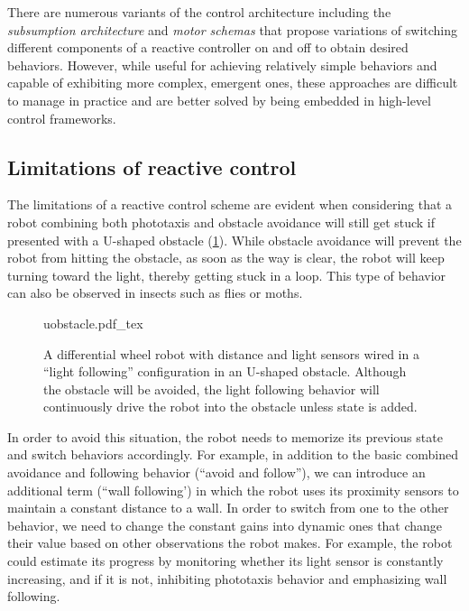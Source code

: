 There are numerous variants of the control architecture including the \textsl{subsumption architecture} \cite{brooks1990elephants} and \textsl{motor schemas} \cite{arkin1989motor} that propose variations of switching different components of a reactive controller on and off to obtain desired behaviors.
However, while useful for achieving relatively simple behaviors and capable of exhibiting more complex, emergent ones, these approaches are difficult to manage in practice and are better solved by being embedded in high-level control frameworks.

\subsection{Limitations of reactive control}

The limitations of a reactive control scheme are evident when considering that a robot combining both phototaxis and obstacle avoidance will still get stuck if presented with a U-shaped obstacle (\cref{fig:uobstacle}). While obstacle avoidance will prevent the robot from hitting the obstacle, as soon as the way is clear, the robot will keep turning toward the light, thereby getting stuck in a loop. This type of behavior can also be observed in insects such as flies or moths.

\begin{figure}
\centering
    \def\svgwidth{0.64\textwidth}
    {uobstacle.pdf_tex}
    \caption{\label{fig:uobstacle}A differential wheel robot with distance and light sensors wired in a ``light following'' configuration in an U-shaped obstacle. Although the obstacle will be avoided, the light following behavior will continuously drive the robot into the obstacle unless state is added.}
\end{figure}

In order to avoid this situation, the robot needs to memorize its previous state and switch behaviors accordingly. For example, in addition to the basic combined avoidance and following behavior (``avoid and follow''), we can introduce an additional term (``wall following') in which the robot uses its proximity sensors to maintain a constant distance to a wall. In order to switch from one to the other behavior, we need to change the constant gains into dynamic ones that change their value based on other observations the robot makes. For example, the robot could estimate its progress by monitoring whether its light sensor is constantly increasing, and if it is not, inhibiting phototaxis behavior and emphasizing wall following.

